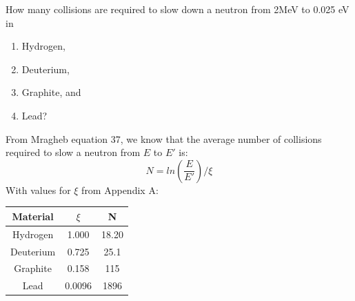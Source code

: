 \documentclass{hw}
\begin{document}
\problem{}
	How many collisions are required to slow down a neutron from 2MeV to 0.025 eV in 
	\begin{enumerate}
		\item Hydrogen,
		\item Deuterium,
		\item Graphite, and
		\item Lead?
	\end{enumerate}
\solution
	From Mragheb equation 37, we know that the average number of collisions required to slow a neutron from $ E $ to $ E' $ is:
	\[
		N = ln \left( \frac{E}{E'} \right) / \xi
	\]
	With values for $ \xi $ from Appendix A:
	\begin{table}[h]
		\begin{tabular}{ |c|c|c| }
			\hline
			Material & $ \xi $ & N \\
			\hline
			Hydrogen & 1.000 & 18.20 \\
			Deuterium & 0.725 & 25.1 \\
			Graphite & 0.158 & 115 \\
			Lead & 0.0096 & 1896 \\
			\hline
		\end{tabular}
	\end{table}
\end{document}
